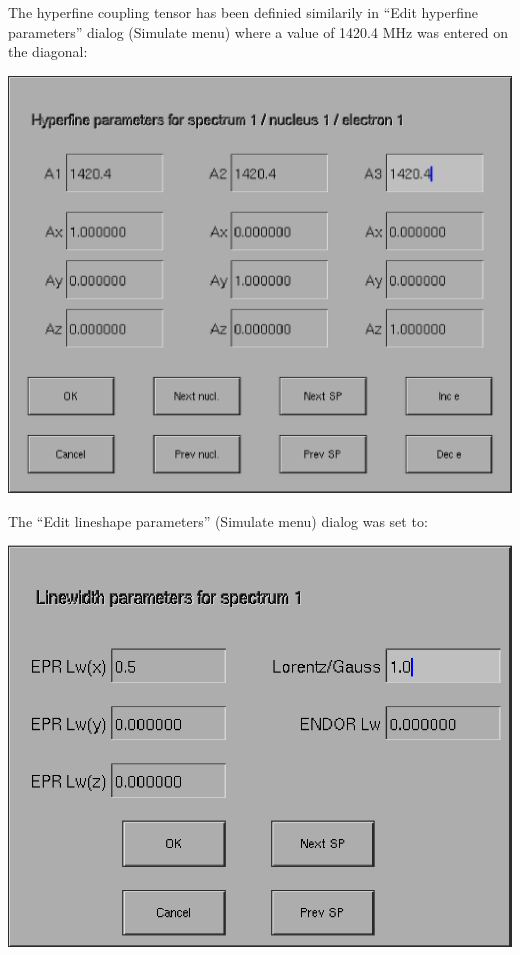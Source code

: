 \documentclass[byrevtex,amssymb,aps,pra,floatfix,letterpaper]{revtex4}
\begin{document}
\noindent
The hyperfine coupling tensor has been definied similarily in ``Edit hyperfine parameters'' dialog (Simulate menu) where a value of 1420.4 MHz was entered on the diagonal:

\begin{center}
\includegraphics[scale=0.4]{fig5}
\end{center}

\noindent
The ``Edit lineshape parameters'' (Simulate menu) dialog was set to:

\begin{center}
\includegraphics[scale=0.4]{fig6}
\end{center}
\end{document}
